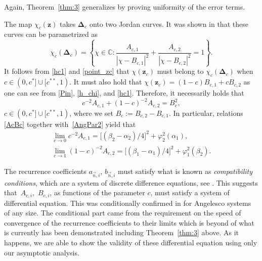 \documentclass[pdftex]{sigma}
\numberwithin{equation}{section}
\newcommand{\C}		{\mathbb{C}}
\newcommand{\n}{{\vec n}}
\newcommand{\z}	{{\boldsymbol z}}
\begin{document}
Again, Theorem~\ref{thm:3} generalizes \cite[Theorem~1.2]{ApDenYa21} by proving uniformity of the error terms.

The map $ \chi_c(\z) $ takes $ \boldsymbol\Delta_c $ onto two Jordan curves. It was shown in \cite[Lemma~4.1.2]{DenYa22} that these curves can be parametrized as
\begin{equation}
\label{chi_curves}
\chi_c(\boldsymbol\Delta_c) = \left\{ \chi\in\C : \frac{A_{c,1}}{|\chi-B_{c,1}|^2} + \frac{A_{c,2}}{|\chi-B_{c,2}|^2} = 1 \right\}.
\end{equation}
It follows from \eqref{hc1} and \eqref{point_zc} that $ \chi(\z_c) $ must belong to $ \chi_c(\boldsymbol\Delta_c) $ when $ c\in(0,c^*]\cup[c^{**},1) $. It must also hold that $ \chi(\z_c)=(1-c)B_{c,1} + cB_{c,2} $ as one can see from \eqref{Pin}, \eqref{h_chi}, and \eqref{hc1}. Therefore, it necessarily holds that
\begin{equation}
\label{AcBc}
c^{-2}A_{c,1} + (1-c)^{-2}A_{c,2} = B_c^2,
\end{equation}
$ c\in(0,c^*]\cup[c^{**},1) $, where we set $ B_c := B_{c,2}-B_{c,1} $. In particular, relations \eqref{AcBc} together with~\eqref{AngPar2} yield that
\begin{gather}
\lim_{c\to0} c^{-2} A_{c,1} = \big[(\beta_2-\alpha_2)/4\big]^2 + \varphi_2^2(\alpha_1),\nonumber \\
\lim_{c\to1} (1-c)^{-2} A_{c,2} = \big[(\beta_1-\alpha_1)/4\big]^2 + \varphi_1^2(\beta_2).\label{c_vanish}
\end{gather}

The recurrence coefficients $ a_{\n,i}$, $b_{\n,i} $ must satisfy what is known as \emph{compatibility conditions}, which are a system of discrete difference equations, see \cite[Theorem~3.2]{VA11}. This suggests that~$ A_{c,i}$,~$B_{c,i} $, as functions of the parameter $ c $, must satisfy a system of differential equation. This was conditionally confirmed in \cite[Theorem~3]{ApKoz20} for Angelesco systems of any size. The conditional part came from the requirement on the speed of convergence of the recurrence coefficients to their limits which is beyond of what is currently has been demonstrated including Theorem~\ref{thm:3} above. As it happens, we are able to show the validity of these differential equation using only our asymptotic analysis.
\end{document}
